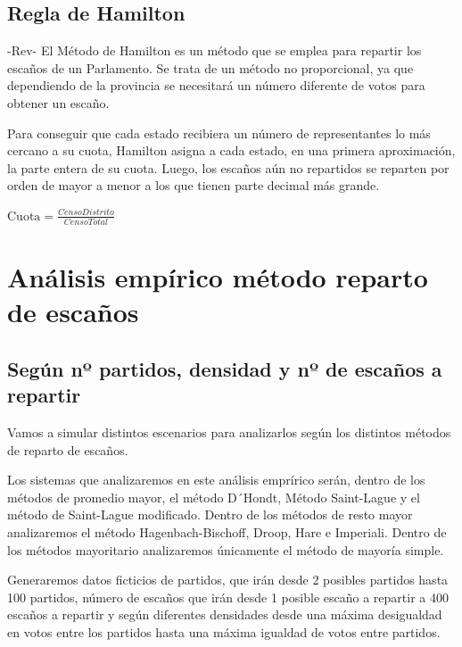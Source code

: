 \documentclass[12pt,a4paper,]{book}
\numberwithin{dummy}{section}
\theoremstyle{ocrenumbox}
\theoremstyle{blacknumex}
\theoremstyle{blacknumbox}
\theoremstyle{ocrenum}
\theoremstyle{ocrenum}
\begin{document}
\hypertarget{regla-de-hamilton}{%
\section{Regla de Hamilton}\label{regla-de-hamilton}}

-Rev- El Método de Hamilton es un método que se emplea para repartir los
escaños de un Parlamento. Se trata de un método no proporcional, ya que
dependiendo de la provincia se necesitará un número diferente de votos
para obtener un escaño.

Para conseguir que cada estado recibiera un número de representantes lo
más cercano a su cuota, Hamilton asigna a cada estado, en una primera
aproximación, la parte entera de su cuota. Luego, los escaños aún no
repartidos se reparten por orden de mayor a menor a los que tienen parte
decimal más grande.

\(\textrm{Cuota} = \frac{Censo Distrito}{Censo Total}\)

\hypertarget{anuxe1lisis-empuxedrico-muxe9todo-reparto-de-escauxf1os}{%
\chapter{Análisis empírico método reparto de
escaños}\label{anuxe1lisis-empuxedrico-muxe9todo-reparto-de-escauxf1os}}

\hypertarget{seguxfan-nuxba-partidos-densidad-y-nuxba-de-escauxf1os-a-repartir}{%
\section{Según nº partidos, densidad y nº de escaños a
repartir}\label{seguxfan-nuxba-partidos-densidad-y-nuxba-de-escauxf1os-a-repartir}}

Vamos a simular distintos escenarios para analizarlos según los
distintos métodos de reparto de escaños.

Los sistemas que analizaremos en este análisis emprírico serán, dentro
de los métodos de promedio mayor, el método D´Hondt, Método Saint-Lague
y el método de Saint-Lague modificado. Dentro de los métodos de resto
mayor analizaremos el método Hagenbach-Bischoff, Droop, Hare e
Imperiali. Dentro de los métodos mayoritario analizaremos únicamente el
método de mayoría simple.

Generaremos datos ficticios de partidos, que irán desde 2 posibles
partidos hasta 100 partidos, número de escaños que irán desde 1 posible
escaño a repartir a 400 escaños a repartir y según diferentes densidades
desde una máxima desigualdad en votos entre los partidos hasta una
máxima igualdad de votos entre partidos.
\end{document}

